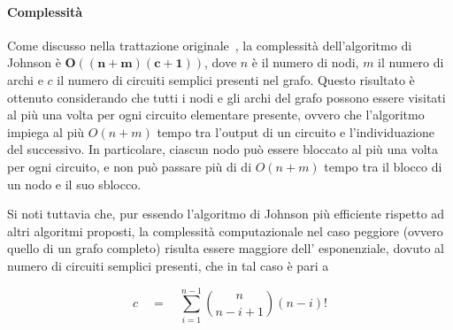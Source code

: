 \paragraph{Complessit\`a}
Come discusso nella trattazione originale~\cite{doi:10.1137/0204007}, la complessit\`a dell'algoritmo di Johnson
\`e $\mathbf{O((n + m)(c + 1))}$, dove $n$ \`e il numero di nodi, $m$ il numero di archi e $c$ il numero di circuiti semplici
presenti nel grafo.
Questo risultato \`e ottenuto considerando che tutti i nodi e gli archi del grafo possono essere visitati al pi\`u una
volta per ogni circuito elementare presente, ovvero che l'algoritmo impiega al pi\`u $O(n + m)$ tempo tra l'output di
un circuito e l'individuazione del successivo.
In particolare, ciascun nodo pu\`o essere bloccato al pi\`u una volta per ogni circuito, e non pu\`o passare pi\`u di
di $O(n + m)$ tempo tra il blocco di un nodo e il suo sblocco. \newline

Si noti tuttavia che, pur essendo l'algoritmo di Johnson pi\`u efficiente rispetto ad altri algoritmi proposti, la
complessit\`a computazionale nel caso peggiore (ovvero quello di un grafo completo) risulta essere maggiore dell'
esponenziale, dovuto al numero di circuiti semplici presenti, che in tal caso \`e pari a

\begin{equation*}
    c \quad = \quad \sum_{i = 1}^{n-1} \binom{n}{n-i+1} (n-i)!
\end{equation*}


